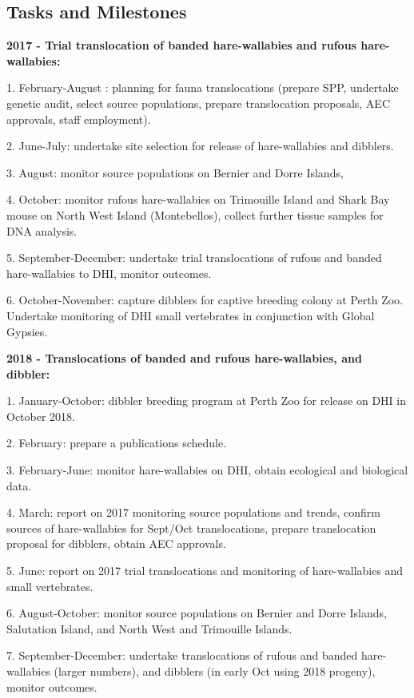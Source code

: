 \documentclass[version=last,
    paper=a4,                               %
    10pt,                                   %
    dvipsnames,
    oneside,                              %
    headings=openany,                       %
    open=any,
    BCOR=7mm,                               %
    DIV=15,     %
]{scrbook}
\begin{document}
\subsection*{Tasks and Milestones}

\textbf{2017 - Trial translocation of banded hare-wallabies and rufous
hare-wallabies:}

1. February-August : planning for fauna translocations (prepare SPP,
undertake genetic audit, select source populations, prepare
translocation proposals, AEC approvals, staff employment).

2. June-July: undertake site selection for release of hare-wallabies and
dibblers.

3. August: monitor source populations on Bernier and Dorre Islands,

4. October: monitor rufous hare-wallabies on Trimouille Island and Shark
Bay mouse on North West Island (Montebellos), collect further tissue
samples for DNA analysis.

5. September-December: undertake trial translocations of rufous and
banded hare-wallabies to DHI, monitor outcomes.

6. October-November: capture dibblers for captive breeding colony at
Perth Zoo. Undertake monitoring of DHI small vertebrates in conjunction
with Global Gypsies.

\textbf{2018 - Translocations of banded and rufous hare-wallabies, and
dibbler:}

1. January-October: dibbler breeding program at Perth Zoo for release on
DHI in October 2018.

2. February: prepare a publications schedule.

3. February-June: monitor hare-wallabies on DHI, obtain ecological and
biological data.

4. March: report on 2017 monitoring source populations and trends,
confirm sources of hare-wallabies for Sept/Oct translocations, prepare
translocation proposal for dibblers, obtain AEC approvals.

5. June: report on 2017 trial translocations and monitoring of
hare-wallabies and small vertebrates.

6. August-October: monitor source populations on Bernier and Dorre
Islands, Salutation Island, and North West and Trimouille Islands.

7. September-December: undertake translocations of rufous and banded
hare-wallabies (larger numbers), and dibblers (in early Oct using 2018
progeny), monitor outcomes.
\end{document}
